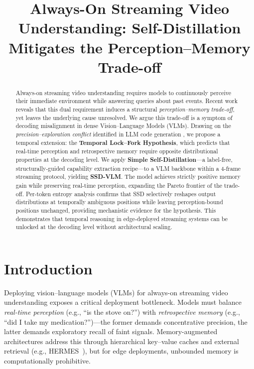 \documentclass[11pt,a4paper]{article}
\title{Always-On Streaming Video Understanding: Self-Distillation Mitigates the Perception--Memory Trade-off}
\author{}
\date{}
\begin{document}
\maketitle

\begin{abstract}
Always-on streaming video understanding requires models to continuously perceive their immediate environment while answering queries about past events. Recent work \cite{simplestream} reveals that this dual requirement induces a structural \textit{perception--memory trade-off}, yet leaves the underlying cause unresolved. We argue this trade-off is a symptom of decoding misalignment in dense Vision--Language Models (VLMs). Drawing on the \textit{precision--exploration conflict} identified in LLM code generation \cite{ssd}, we propose a temporal extension: the \textbf{Temporal Lock--Fork Hypothesis}, which predicts that real-time perception and retrospective memory require opposite distributional properties at the decoding level. We apply \textbf{Simple Self-Distillation}---a label-free, structurally-guided capability extraction recipe---to a VLM backbone within a 4-frame streaming protocol, yielding \textbf{SSD-VLM}. The model achieves strictly positive memory gain while preserving real-time perception, expanding the Pareto frontier of the trade-off. Per-token entropy analysis confirms that SSD selectively reshapes output distributions at temporally ambiguous positions while leaving perception-bound positions unchanged, providing mechanistic evidence for the hypothesis. This demonstrates that temporal reasoning in edge-deployed streaming systems can be unlocked at the decoding level without architectural scaling.
\end{abstract}

\section{Introduction}
Deploying vision--language models (VLMs) for always-on streaming video understanding exposes a critical deployment bottleneck. Models must balance \textit{real-time perception} (e.g., ``is the stove on?'') with \textit{retrospective memory} (e.g., ``did I take my medication?'')---the former demands concentrative precision, the latter demands exploratory recall of faint signals. Memory-augmented architectures address this through hierarchical key--value caches and external retrieval (e.g., HERMES~\cite{hermes}), but for edge deployments, unbounded memory is computationally prohibitive.
\end{document}
